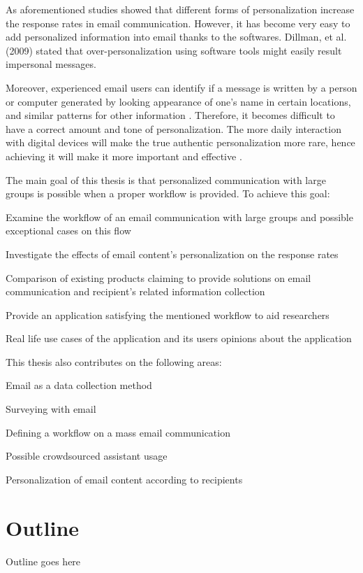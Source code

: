 As aforementioned studies showed that different forms of personalization increase the response rates in email communication. However, it has become very easy to add personalized information into email thanks to the softwares. Dillman, et al. (2009) stated that over-personalization using software tools might easily result impersonal messages.

 Moreover, experienced email users can identify if a message is written by a person or computer generated by looking appearance of one's name in certain locations, and similar patterns for other information \citep[page 272]{DillmanDonA.SmythJoleneD.Christian2009}. Therefore, it becomes difficult to have a correct amount and tone of personalization. The more daily interaction with digital devices will make the true authentic personalization more rare, hence achieving it will make it more important and effective \citep[page 238]{DillmanDonA.SmythJoleneD.Christian2009}.

\vspace{1cm}

The main goal of this thesis is that personalized communication with large groups is possible when a proper workflow is provided. To achieve this goal:

\begin{compactenum}
	\item Examine the workflow of an email communication with large groups and possible exceptional cases on this flow
	\item Investigate the effects of email content's personalization on the response rates
	\item Comparison of  existing products claiming to provide solutions on email communication and recipient's related information collection
	\item Provide an application satisfying the mentioned workflow to aid researchers
	\item Real life use cases of the application and its users opinions about the application
\end{compactenum}
\vspace{1cm}

This thesis also contributes on the following areas:

\begin{compactenum}
	\item Email as a data collection method
	\item Surveying with email
	\item Defining a workflow on a mass email communication
	\item Possible crowdsourced assistant usage
	\item Personalization of email content according to recipients
\end{compactenum}


\section{Outline}
\label{sec:3:Outline}
Outline goes here

